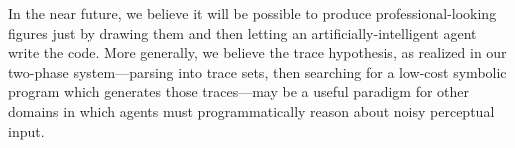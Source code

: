 \documentclass{article}
\theoremstyle{definition}
\begin{document}
In the near future, we believe it will be possible to produce professional-looking figures just by drawing them and then letting an artificially-intelligent agent write the code.
More generally, we believe the trace hypothesis, as realized in our two-phase system---parsing into trace sets, then searching for a low-cost symbolic program which generates those traces---may be a useful paradigm for other domains in which agents must programmatically reason about noisy perceptual input.





%



                  {\small }
\end{document}
